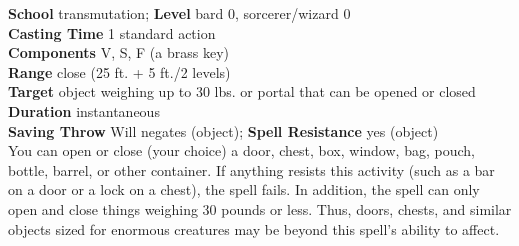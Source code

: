 \textbf{School} transmutation; \textbf{Level} bard 0, sorcerer/wizard 0\\
\textbf{Casting Time} 1 standard action\\
\textbf{Components} V, S, F (a brass key)\\
\textbf{Range} close (25 ft. + 5 ft./2 levels)\\
\textbf{Target} object weighing up to 30 lbs. or portal that can be opened or closed\\
\textbf{Duration} instantaneous\\
\textbf{Saving Throw }Will negates (object); \textbf{Spell Resistance} yes (object)\\
You can open or close (your choice) a door, chest, box, window, bag, pouch, bottle, barrel, or other container. If anything resists this activity (such as a bar on a door or a lock on a chest), the spell fails. In addition, the spell can only open and close things weighing 30 pounds or less. Thus, doors, chests, and similar objects sized for enormous creatures may be beyond this spell's ability to affect.\\
